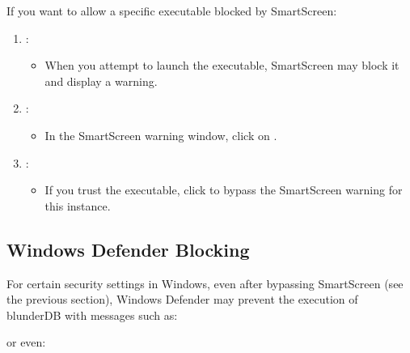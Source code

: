 \documentclass[letterpaper,10pt,english]{sphinxmanual}
\begin{document}
\sphinxAtStartPar
If you want to allow a specific executable blocked by SmartScreen:
\begin{enumerate}
%
\item {} 
\sphinxAtStartPar
{}:
\begin{itemize}
\item {} 
\sphinxAtStartPar
When you attempt to launch the executable, SmartScreen may block it and display a warning.

\end{itemize}

\item {} 
\sphinxAtStartPar
{}:
\begin{itemize}
\item {} 
\sphinxAtStartPar
In the SmartScreen warning window, click on .

\end{itemize}

\item {} 
\sphinxAtStartPar
{}:
\begin{itemize}
\item {} 
\sphinxAtStartPar
If you trust the executable, click  to bypass the SmartScreen warning for this instance.

\end{itemize}

\end{enumerate}


\subsection{Windows Defender Blocking}
\label{\detokenize{annexe_windows_securite:blocage-windows-defender}}
\sphinxAtStartPar
For certain security settings in Windows, even after bypassing SmartScreen (see the previous section), Windows Defender may prevent the execution of blunderDB with messages such as:

\begin{figure}[htbp]
\centering

\noindent{}
\end{figure}

\sphinxAtStartPar
or even:

\begin{figure}[htbp]
\centering

\noindent{}
\end{figure}
\end{document}
